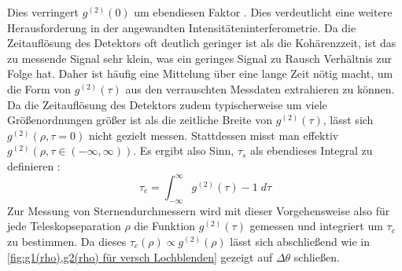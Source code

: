 Dies verringert $g^{(2)}(0)$ um ebendiesen Faktor \cite[Kap. 14.7]{mandelOpticalCoherenceQuantum1995}. 
Dies verdeutlicht eine weitere Herausforderung in der angewandten Intensitäteninterferometrie. 
Da die Zeitauflösung des Detektors oft deutlich geringer ist als die Kohärenzzeit, ist das zu messende Signal sehr klein, was ein geringes Signal zu Rausch Verhältnis zur Folge hat. 
Daher ist häufig eine Mittelung über eine lange Zeit nötig macht, um die Form von $g^{(2)}(\tau)$ aus den verrauschten Messdaten extrahieren zu können.\\
Da die Zeitauflösung des Detektors zudem typischerweise um viele Größenordnungen größer ist als die zeitliche Breite von $g^{(2)}(\tau)$, lässt sich $g^{(2)}(\rho, \tau=0)$ nicht gezielt messen. 
Stattdessen misst man effektiv $g^{(2)}(\rho, \tau\in(-\infty, \infty))$. 
Es ergibt also Sinn, $\tau_s$ als ebendieses Integral zu definieren \cite[Eq. 14.7-2]{mandelOpticalCoherenceQuantum1995}: 
\begin{equation}
    \tau_c = \int_{-\infty}^{\infty} g^{(2)}(\tau) - 1\;d\tau
\end{equation}
Zur Messung von Sternendurchmessern wird mit dieser Vorgehensweise also für jede Teleskopseparation $\rho$ die Funktion $g^{(2)}(\tau)$ gemessen und integriert um $\tau_c$ zu bestimmen. 
Da dieses $\tau_c(\rho)\propto g^{(2)}(\rho)$ lässt sich abschließend wie in \autoref{fig:g1(rho),g2(rho) für versch Lochblenden} gezeigt auf $\Delta\theta$ schließen. 
